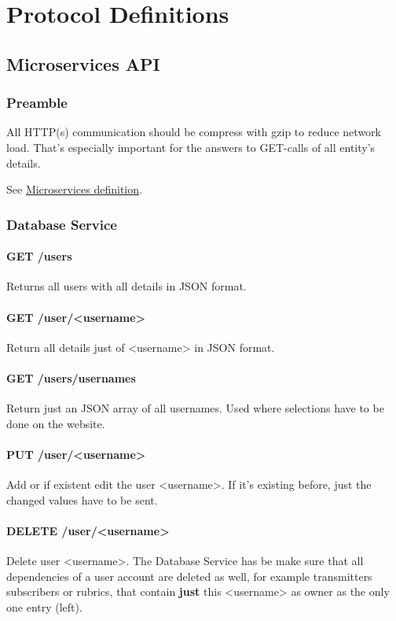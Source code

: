 \chapter{Protocol Definitions}

\section{Microservices API}
\label{protocoldef:microservicesapi}

\subsection{Preamble}
All HTTP(s) communication should be compress with gzip to reduce network load. That's especially important for the answers to GET-calls of all entity's details.

See \hyperref[internalprog:microservices]{Microservices definition}.

\subsection{Database Service}
\subsubsection{GET /users}
Returns all users with all details in JSON format.

\subsubsection{GET /user/<username>}
Return all details just of <username> in JSON format.

\subsubsection{GET /users/usernames}
Return just an JSON array of all usernames. Used where selections have to be done on the website.

\subsubsection{PUT /user/<username>}
Add or if existent edit the user <username>. If it's existing before, just the changed values have to be sent.

\subsubsection{DELETE /user/<username>}
Delete user <username>. The Database Service has be make sure that all dependencies of a user account are deleted as well, for example transmitters subscribers or rubrics, that contain \textbf{just} this <username> as owner as the only one entry (left).

